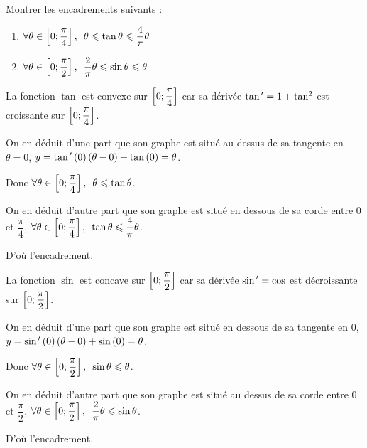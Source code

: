\begin{exo}
Montrer les encadrements suivants :

\begin{enumerate}
\item \(\quantifs{\forall\theta\in\intervii{0}{\dfrac{\pi}{4}}}\theta\leq\tan\theta\leq\dfrac{4}{\pi}\theta\) \\

\item \(\quantifs{\forall\theta\in\intervii{0}{\dfrac{\pi}{2}}}\dfrac{2}{\pi}\theta\leq\sin\theta\leq\theta\)
\end{enumerate}
\end{exo}

\begin{corr}[1]
La fonction \(\tan\) est convexe sur \(\left[0;\dfrac{\pi}{4}\right]\) car sa dérivée \(\tan^{\,\prime}=1+\tan^2\) est croissante sur \(\left[0;\dfrac{\pi}{4}\right]\).

On en déduit d'une part que son graphe est situé au dessus de sa tangente en \(\theta=0\), \cad \(y=\tan^{\,\prime}\left(0\right)\left(\theta-0\right)+\tan\left(0\right)=\theta\).

Donc \(\quantifs{\forall\theta\in\intervii{0}{\dfrac{\pi}{4}}}\theta\leq\tan\theta\).

On en déduit d'autre part que son graphe est situé en dessous de sa corde entre \(0\) et \(\dfrac{\pi}{4}\), \cad \(\quantifs{\forall\theta\in\intervii{0}{\dfrac{\pi}{4}}}\tan\theta\leq\dfrac{4}{\pi}\theta\).

D'où l'encadrement.
\end{corr}

\begin{corr}[2]
La fonction \(\sin\) est concave sur \(\left[0;\dfrac{\pi}{2}\right]\) car sa dérivée \(\sin^{\,\prime}=\cos\) est décroissante sur \(\left[0;\dfrac{\pi}{2}\right]\).

On en déduit d'une part que son graphe est situé en dessous de sa tangente en \(0\), \cad \(y=\sin^{\,\prime}\left(0\right)\left(\theta-0\right)+\sin\left(0\right)=\theta\).

Donc \(\quantifs{\forall\theta\in\intervii{0}{\dfrac{\pi}{2}}}\sin\theta\leq\theta\).

On en déduit d'autre part que son graphe est situé au dessus de sa corde entre \(0\) et \(\dfrac{\pi}{2}\), \cad \(\quantifs{\forall\theta\in\intervii{0}{\dfrac{\pi}{2}}}\dfrac{2}{\pi}\theta\leq\sin\theta\).

D'où l'encadrement.
\end{corr}